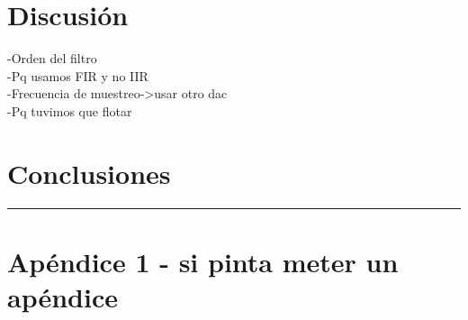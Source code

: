 \documentclass[11pt,a4paper]{extarticle}
\begin{document}
\begin{multicols}{2}
\section{Discusión}
-Orden del filtro\\
-Pq usamos FIR y no IIR\\
-Frecuencia de muestreo->usar otro dac\\
-Pq tuvimos que flotar\\

\section{Conclusiones}





\end{multicols}
\newpage
\begin{appendices}
\vspace{-1em}
\hrule
\vspace{1em}
\normalsize
\section{Apéndice 1 - si pinta meter un apéndice}
\end{appendices}
\end{document}
